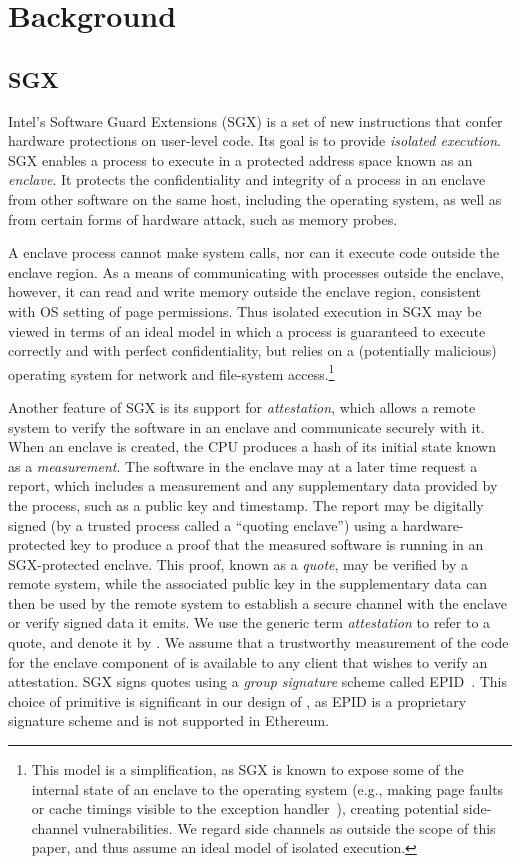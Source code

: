 \section{Background}
\subsection{SGX}
Intel's Software Guard Extensions (SGX) is a set of new instructions that confer hardware protections on user-level code. Its goal is to provide \emph{isolated execution}. SGX enables a process to execute in a protected address space known as an {\em enclave}. It protects the confidentiality and integrity of a process in an enclave from other software on the same host, including the operating system, as well as from certain forms of hardware attack, such as memory probes. 

A enclave process cannot make system calls, nor can it execute code outside the enclave region. As a means of communicating with processes outside the enclave, however, it can read and write memory outside the enclave region, consistent with OS setting of page permissions. Thus  isolated execution in SGX may be viewed in terms of an ideal model in which a process is guaranteed to execute correctly and with perfect confidentiality, but relies on a (potentially malicious) operating system for network and file-system access.\footnote{This model is a simplification, as SGX is known to expose some of the internal state of an enclave to the operating system (e.g., making page faults or cache timings visible to the exception handler~\cite{sgxexplained}), creating potential side-channel vulnerabilities. We regard side channels as outside the scope of this paper, and thus assume an ideal model of isolated execution.}

Another feature of SGX is its support for \emph{attestation}, which allows a remote system to verify the software in an enclave and communicate securely with it. When an enclave is created, the CPU produces a hash of its initial state known as a {\em measurement}. The software in the enclave may at a later time request a report, which includes a measurement and any supplementary data provided by the process, such as a public key and timestamp. The report may be digitally signed (by a trusted process called a ``quoting enclave'') using a hardware-protected key to produce a proof that the measured software is running in an SGX-protected enclave. This proof, known as a {\em quote}, may be verified by a remote system, while the associated public key in the supplementary data can then be used by the remote system to establish a secure channel with the enclave or verify signed data it emits. We use the generic term {\em attestation} to refer to a quote, and denote it by \att. We assume that a trustworthy measurement of the code for the enclave component of \tc is available to any client that wishes to verify an attestation. SGX signs quotes using a \emph{group signature} scheme called EPID~\cite{}. This choice of primitive is significant in our design of \tcs, as EPID is a proprietary signature scheme and is not supported in Ethereum.

